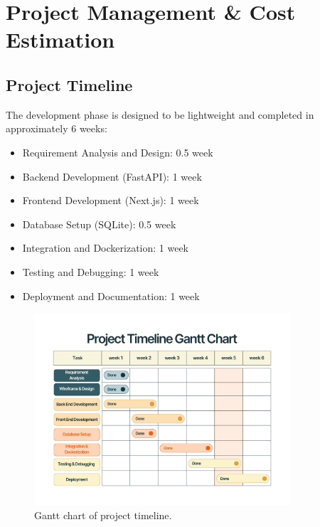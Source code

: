 \section{Project Management \& Cost Estimation}

\subsection*{Project Timeline}
The development phase is designed to be lightweight and completed in approximately 6 weeks:

\begin{itemize}
    \item Requirement Analysis and Design: 0.5 week
    \item Backend Development (FastAPI): 1 week
    \item Frontend Development (Next.js): 1 week
    \item Database Setup (SQLite): 0.5 week
    \item Integration and Dockerization: 1 week
    \item Testing and Debugging: 1 week
    \item Deployment and Documentation: 1 week
\end{itemize}

\begin{figure}[htbp]
  \begin{center}
    \includegraphics[width=0.85\textwidth]{figures/gantt-chart.png}
  \end{center}
  \caption{Gantt chart of project timeline.}\label{fig:gantt-chart}
\end{figure}


